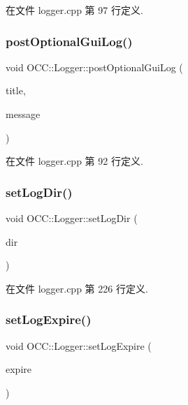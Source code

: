 在文件 logger.\+cpp 第 97 行定义.

\mbox{\label{class_o_c_c_1_1_logger_a91ab11137ca08b29863079279f8060cb}} 
\subsubsection{\texorpdfstring{post\+Optional\+Gui\+Log()}{postOptionalGuiLog()}}
{\footnotesize\ttfamily void O\+C\+C\+::\+Logger\+::post\+Optional\+Gui\+Log (\begin{DoxyParamCaption}\item[{const Q\+String \&}]{title,  }\item[{const Q\+String \&}]{message }\end{DoxyParamCaption})}



在文件 logger.\+cpp 第 92 行定义.

\mbox{\label{class_o_c_c_1_1_logger_acb0ee8a85ca9d7ae6f92db8b1571278d}} 
\subsubsection{\texorpdfstring{set\+Log\+Dir()}{setLogDir()}}
{\footnotesize\ttfamily void O\+C\+C\+::\+Logger\+::set\+Log\+Dir (\begin{DoxyParamCaption}\item[{const Q\+String \&}]{dir }\end{DoxyParamCaption})}



在文件 logger.\+cpp 第 226 行定义.

\mbox{\label{class_o_c_c_1_1_logger_a82bcdb38dbc0b80d0c00847e2631f16f}} 
\subsubsection{\texorpdfstring{set\+Log\+Expire()}{setLogExpire()}}
{\footnotesize\ttfamily void O\+C\+C\+::\+Logger\+::set\+Log\+Expire (\begin{DoxyParamCaption}\item[{int}]{expire }\end{DoxyParamCaption})}



